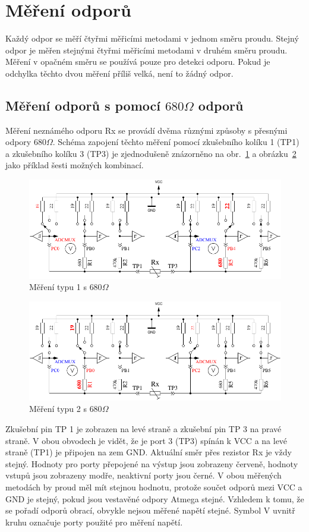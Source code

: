 \section{Měření odporů}
Každý odpor se měří čtyřmi měřicími metodami v jednom směru proudu.
Stejný odpor je měřen stejnými čtyřmi měřicími metodami v druhém směru proudu.
Měření v opačném směru se používá pouze pro detekci odporu.
Pokud je odchylka těchto dvou měření příliš velká, není to žádný odpor.

\subsection{Měření odporů s pomocí \(680\Omega\) odporů}
Měření neznámého odporu Rx se provádí dvěma různými způsoby s přesnými odpory \(680\Omega\).
Schéma zapojení těchto měření pomocí zkušebního kolíku 1 (TP1) a zkušebního kolíku 3 (TP3)
je zjednodušeně znázorněno na obr.~\ref{fig:RL1mes} a obrázku~\ref{fig:RL2mes} jako příklad
šesti možných kombinací.

\begin{figure}[H]
\centering
\includegraphics[width=.8\textwidth]{../FIG/ResistormessL1.pdf}
\caption{Měření typu 1 s \(680\Omega\) }
\label{fig:RL1mes}
\end{figure}

\begin{figure}[H]
 \centering
 \includegraphics[width=.8\textwidth]{../FIG/ResistormessL2.pdf}
 \caption{Měření typu 2 s \(680\Omega\) }
\label{fig:RL2mes}
\end{figure}

Zkušební pin TP 1 je zobrazen na levé straně a zkušební pin TP 3 na pravé straně.
V obou obvodech je vidět, že je port 3 (TP3) spínán k VCC a na levé straně (TP1)
je připojen na zem GND.
Aktuální směr přes rezistor Rx je vždy stejný.
Hodnoty pro porty přepojené na výstup jsou zobrazeny červeně,
hodnoty vstupů jsou zobrazeny modře, neaktivní porty jsou černé.
V obou měřených metodách by proud měl mít stejnou hodnotu, protože součet odporů mezi
VCC a GND je stejný, pokud jsou vestavěné odpory Atmega stejné.
Vzhledem k tomu, že se pořadí odporů obrací, obvykle nejsou měřené napětí stejné.
Symbol V uvnitř kruhu označuje porty použité pro měření napětí.


